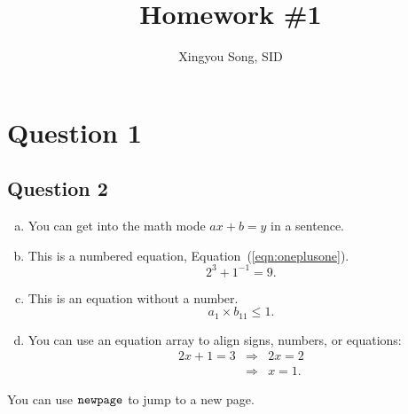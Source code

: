 \documentclass{article}
\begin{document}
\title{\vspace{-0.7in}Homework \#1}
\author{Xingyou Song, SID}
\date{}
\maketitle


\section{Question 1}
\begin{enumerate}[(a)]








\section{Question 2}

\begin{enumerate}[(a)]
$X_{1} \and X_{2} = 1$ 

\item You can get into the math mode $ax+b=y$ in a sentence.
\item This is a numbered equation, Equation~(\ref{eqn:oneplusone}).
\begin{equation} \label{eqn:oneplusone}
	2^3+1^{-1}=9.
\end{equation}
\item This is an equation without a number.
\begin{displaymath}
	a_1\times b_{11} \leq 1.
\end{displaymath}
\item You can use an equation array to align signs, numbers, or equations: 
\begin{eqnarray*}
	2x+1=3	& \Longrightarrow & 2x=2 \\
			& \Longrightarrow & x=1.
\end{eqnarray*}

\end{enumerate}
You can use $\mathtt{\\newpage}$ to jump to a new page.


\end{enumerate}
\end{document}
